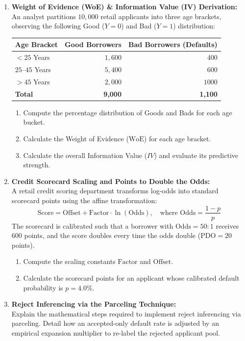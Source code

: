 \begin{enumerate}[label=\textbf{P8.\arabic*}]
    \item \textbf{Weight of Evidence (WoE) \& Information Value (IV) Derivation:}\\
    An analyst partitions $10{,}000$ retail applicants into three age brackets, observing the following Good ($Y=0$) and Bad ($Y=1$) distribution:
    \begin{center}
    \begin{tabular}{lrr}
    \toprule
    \textbf{Age Bracket} & \textbf{Good Borrowers} & \textbf{Bad Borrowers (Defaults)} \\
    \midrule
    $< 25$ Years & $1{,}600$ & $400$ \\
    $25$--$45$ Years & $5{,}400$ & $600$ \\
    $> 45$ Years & $2{,}000$ & $1000$ \\
    \midrule
    \textbf{Total} & \textbf{9,000} & \textbf{1,100} \\
    \bottomrule
    \end{tabular}
    \end{center}
    \begin{enumerate}[label=(\alph*)]
        \item Compute the percentage distribution of Goods and Bads for each age bucket.
        \item Calculate the Weight of Evidence ($\text{WoE}$) for each age bracket.
        \item Calculate the overall Information Value ($IV$) and evaluate its predictive strength.
    \end{enumerate}

    \item \textbf{Credit Scorecard Scaling and Points to Double the Odds:}\\
    A retail credit scoring department transforms log-odds into standard scorecard points using the affine transformation:
    \begin{equation*}
    \text{Score} = \text{Offset} + \text{Factor} \cdot \ln(\text{Odds}), \quad \text{where } \text{Odds} = \frac{1 - p}{p}
    \end{equation*}
    The scorecard is calibrated such that a borrower with $\text{Odds} = 50:1$ receives $600$ points, and the score doubles every time the odds double ($\text{PDO} = 20$ points).
    \begin{enumerate}[label=(\alph*)]
        \item Compute the scaling constants $\text{Factor}$ and $\text{Offset}$.
        \item Calculate the scorecard points for an applicant whose calibrated default probability is $p = 4.0\%$.
    \end{enumerate}

    \item \textbf{Reject Inferencing via the Parceling Technique:}\\
    Explain the mathematical steps required to implement reject inferencing via parceling. Detail how an accepted-only default rate is adjusted by an empirical expansion multiplier to re-label the rejected applicant pool.
\end{enumerate}

